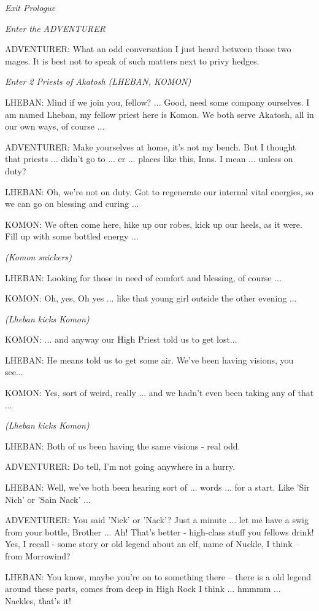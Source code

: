 \textit{Exit Prologue}

\textit{Enter the ADVENTURER}

ADVENTURER: What an odd conversation I just heard between those two mages. It is best not to speak of such matters next to privy hedges.

\textit{Enter 2 Priests of Akatosh (LHEBAN, KOMON)}

LHEBAN: Mind if we join you, fellow? ... Good, need some company ourselves. I am named Lheban, my fellow priest here is Komon. We both serve Akatosh, all in our own ways, of course ...

ADVENTURER: Make yourselves at home, it's not my bench. But I thought that priests ... didn't go to ... er ... places like this, Inns. I mean ... unless on duty?

LHEBAN: Oh, we're not on duty. Got to regenerate our internal vital energies, so we can go on blessing and curing ...

KOMON: We often come here, hike up our robes, kick up our heels, as it were. Fill up with some bottled energy ...

\textit{(Komon snickers)}

LHEBAN: Looking for those in need of comfort and blessing, of course ...

KOMON: Oh, yes, Oh yes ... like that young girl outside the other evening ...

\textit{(Lheban kicks Komon)}

KOMON: ... and anyway our High Priest told us to get lost...

LHEBAN: He means told us to get some air. We've been having visions, you see...

KOMON: Yes, sort of weird, really ... and we hadn't even been taking any of that ...

\textit{(Lheban kicks Komon)}

LHEBAN: Both of us been having the same visions - real odd.

ADVENTURER: Do tell, I'm not going anywhere in a hurry.

LHEBAN: Well, we've both been hearing sort of ... words ... for a start. Like 'Sir Nich' or 'Sain Nack' ...

ADVENTURER: You said 'Nick' or 'Nack'? Just a minute ... let me have a swig from your bottle, Brother ... Ah! That's better - high-class stuff you fellows drink! Yes, I recall - some story or old legend about an elf, name of Nuckle, I think -- from Morrowind?

LHEBAN: You know, maybe you're on to something there -- there is a old legend around these parts, comes from deep in High Rock I think ... hmmmm ... Nackles, that's it!


